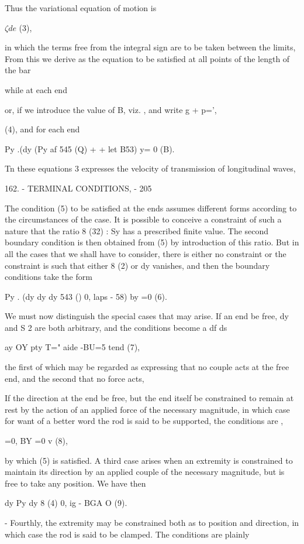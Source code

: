 Thus the variational equation of motion is

\(\zeta  de\) (3),

in which the terms free from the integral sign are to be taken between
the limits, From this we derive as the equation to be satisfied at all
points of the length of the bar

while at each end

or, if we introduce the value of B, viz. , and write g + p=',

(4), and for each end

Py .(dy (Py af 545 (Q) + + let B53) y= 0 (B).

Tn these equations 3 expresses the velocity of transmission of
longitudinal waves,

162. - TERMINAL CONDITIONS, - 205

The condition (5) to be satisfied at the ends assumes different forms
according to the circumstances of the case. It is possible to conceive a
constraint of such a nature that the ratio 8 (32) : Sy has a prescribed
finite value. The second boundary condition is then
obtained from (5) by introduction of this ratio. But in all the cases
that we shall have to consider, there is either no constraint
or the constraint is such that either 8 (2) or dy vanishes, and then the
boundary conditions take the form

Py . (dy dy dy 543 () 0, laps - 58) by =0 (6).

We must now distinguish the special cases that may arise. If an end be
free, dy and S 2 are both arbitrary, and the conditions become a
df ds

ay OY pty T=" aide -BU=5 tend (7),

the first of which may be regarded as expressing that no couple acts at
the free end, and the second that no force acts,

If the direction at the end be free, but the end itself be constrained
to remain at rest by the action of an applied force of the necessary
magnitude, in which case for want of a better word the rod is said to be
supported, the conditions are ,

=0, BY =0 v (8),

by which (5) is satisfied. A third case arises when an extremity is
constrained to maintain its direction by an applied couple of the
necessary magnitude, but is free to take any position. We have then

dy Py dy 8 (4) 0, ig - BGA O (9).

- Fourthly, the extremity may be constrained both as to position and
direction, in which case the rod is said to be clamped. The conditions
are plainly

